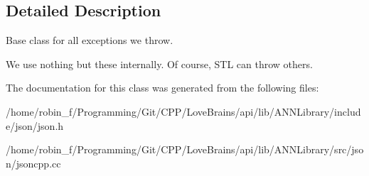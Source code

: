 \subsection{Detailed Description}
Base class for all exceptions we throw.

We use nothing but these internally. Of course, S\+T\+L can throw others. 

The documentation for this class was generated from the following files\+:\begin{DoxyCompactItemize}
\item 
/home/robin\+\_\+f/\+Programming/\+Git/\+C\+P\+P/\+Love\+Brains/api/lib/\+A\+N\+N\+Library/include/json/json.\+h\item 
/home/robin\+\_\+f/\+Programming/\+Git/\+C\+P\+P/\+Love\+Brains/api/lib/\+A\+N\+N\+Library/src/json/jsoncpp.\+cc\end{DoxyCompactItemize}
